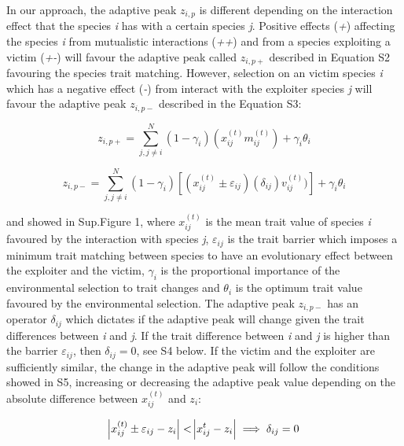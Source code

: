 \documentclass[a4paper, 12pt]{article}
\begin{document}
In our approach, the adaptive peak $z_{i, p}$ is different depending on the interaction effect that the species \textit{i} has with a certain species \textit{j}. Positive effects (\textit{+}) affecting the species \textit{i} from mutualistic interactions (\textit{++}) and from a species exploiting a victim (\textit{+-}) will favour the adaptive peak called $z_{i, p +}$ described in Equation S2 favouring the species trait matching. However, selection on an victim species \textit{i} which has a negative effect (\textit{-}) from interact with the exploiter species \textit{j} will favour the adaptive peak $z_{i, p -}$ described in the Equation S3:

\begin{equation}  \label{supeq:2}
  z_{i, p +} = \sum_{j, j \neq i}^{N} (1 - \gamma_{i})(x^{(t)}_{ij} m^{(t)}_{ij}) + \gamma_{i} \theta_{i}
\end{equation}

\begin{equation} \label{supeq:3}
  z_{i, p -} = \sum_{j, j \neq i}^{N}(1 - \gamma_{i})[(x^{(t)}_{ij} \pm \varepsilon_{ij})(\delta_{ij})v^{(t)}_{ij})] + \gamma_{i} \theta_{i}
\end{equation}

and showed in Sup.Figure 1, where $x^{(t)}_{ij}$ is the mean trait value of species \textit{i} favoured by the interaction with species \textit{j}, $\varepsilon_{ij}$ is the trait barrier which imposes a minimum trait matching between species to have an evolutionary effect between the exploiter and the victim, $\gamma_i$ is the proportional importance of the environmental selection to trait changes and $\theta_i$ is the optimum trait value favoured by the environmental selection. The adaptive peak $ z_{i, p -}$ has an operator $\delta_{ij}$ which dictates if the adaptive peak will change given the trait differences between \textit{i} and \textit{j}. If the trait difference between \textit{i} and \textit{j} is higher than the barrier $\varepsilon_{ij}$, then $\delta_{ij} = 0$, see S4 below. If the victim and the exploiter are sufficiently similar, the change in the adaptive peak will follow the conditions showed in S5, increasing or decreasing the adaptive peak value depending on the absolute difference between $x^{(t)}_{ij}$ and $z_{i}$:

\begin{equation} \label{supeq:4}
\abs{x^{(t)}_{ij} \pm \varepsilon_{ij} - z_{i}} < \abs{x^{t}_{ij} - z_{i}} \implies \delta_{ij} = 0
\end{equation}
\end{document}
